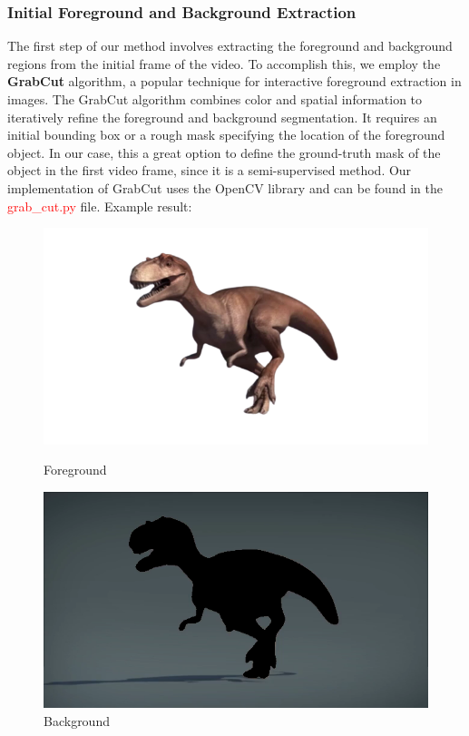 \documentclass[12pt]{article}
\begin{document}
\subsubsection{Initial Foreground and Background Extraction}\label{subsubsec:initial-foreground-and-background-extraction}
The first step of our method involves extracting the foreground and background regions from the initial frame of the video.
To accomplish this, we employ the \textbf{GrabCut} algorithm, a popular technique for interactive foreground extraction in images.
The GrabCut algorithm combines color and spatial information to iteratively refine the foreground and background segmentation.
It requires an initial bounding box or a rough mask specifying the location of the foreground object.
In our case, this a great option to define the ground-truth mask of the object in the first video frame, since it is a semi-supervised method.
Our implementation of GrabCut uses the OpenCV library and can be found in the \textcolor{red}{grab\_cut.py} file.
Example result:
\begin{figure}[h!]
    \begin{minipage}{0.5\textwidth}
    \centering
    \includegraphics[scale=0.4]{images/dinosaur/foreground_ratio1.0}
    \caption{Foreground}
    \end{minipage}
    \begin{minipage}{0.5\textwidth}
    \centering
    \includegraphics[scale=0.4]{images/dinosaur/background_ratio1.0}
    \caption{Background}
    \end{minipage}\label{fig:foreground extraction}
\end{figure}
\end{document}
